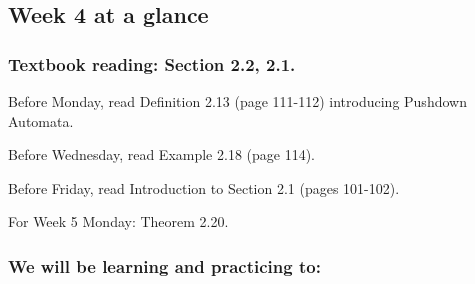 

\subsection*{Week 4 at a glance}


\subsubsection*{Textbook reading: Section 2.2, 2.1.}

\vspace{-15pt}

Before Monday, read Definition 2.13 (page 111-112) introducing Pushdown Automata.

Before Wednesday, read Example 2.18 (page 114).

Before Friday, read Introduction to Section 2.1 (pages 101-102).

For Week 5 Monday: Theorem  2.20.

\vspace{-20pt}

\subsubsection*{We will be learning and practicing to:}


